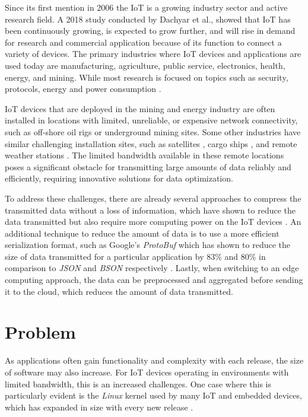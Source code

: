 Since its first mention in 2006 \cite{Adelmann2006ToolkitFB} the \ac{IoT}
is a growing industry sector and active research field. A 2018 study conducted
by Dachyar et al., showed that \ac{IoT} has been continuously growing, is expected
to grow further, and will rise in demand for research and commercial application
because of its function to connect a variety of devices. The primary industries
where \ac{IoT} devices and applications are used today are manufacturing,
agriculture, public service, electronics, health, energy, and mining.
While most research is focused on topics such as security, protocols, energy and
power consumption \cite{dachyar2019knowledge}.

\ac{IoT} devices that are deployed in the mining and energy industry are often
installed in locations with limited, unreliable, or expensive network
connectivity, such as off-shore oil rigs or underground mining sites.
Some other industries have similar challenging installation sites, such as
satellites \cite{electronics8111247}, cargo ships \cite{9090272}, and remote weather stations \cite{info12040146}.
The limited bandwidth available in these remote locations poses a significant
obstacle for transmitting large amounts of data reliably and efficiently,
requiring innovative solutions for data optimization.

To address these challenges, there are already several approaches to compress
the transmitted data without a loss of information, which have shown to reduce
the data transmitted but also require more computing power on the \ac{IoT}
devices \cite{9243457}. An additional technique to reduce the amount of data
is to use a more efficient serialization format, such as Google's \textit{ProtoBuf}
which has shown to reduce the size of data transmitted for a particular application
by 83\% and 80\% in comparison to \textit{JSON} and \textit{BSON} respectively \cite{7765670}.
Lastly, when switching to an edge computing approach, the data can be preprocessed
and aggregated before sending it to the cloud, which reduces the amount of data
transmitted.


\section{Problem}
As applications often gain functionality and complexity with each release, the
size of software may also increase. For \ac{IoT} devices operating in environments
with limited bandwidth, this is an increased challenges. One case where this is
particularly evident is the \textit{Linux} kernel used by many \ac{IoT} and embedded
devices, which has expanded in size with every new release \cite{linux-kernel-report}.

